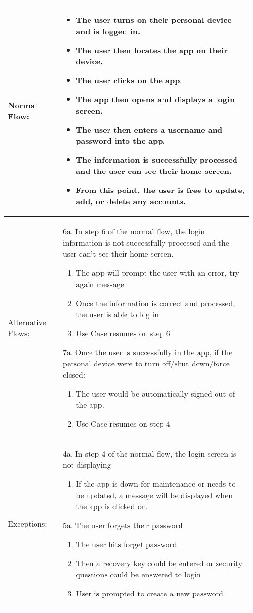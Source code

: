 \documentclass[stu]{apa7}
\newcommand{\nextitemblank}{\par\hspace*{\labelsep}\hspace*{\labelsep}}
\begin{document}
{{\begin{xltabular}{\textwidth}{|l|X|}
  Normal Flow: & 
    \begin{itemize}
      \item The user turns on their personal device and is logged in. 
      \item The user then locates the app on their device. 
      \item The user clicks on the app.
      \item The app then opens and displays a login screen.
      \item The user then enters a username and password into the app.
      \item The information is successfully processed and the user can see their home screen.
      \item From this point, the user is free to update, add, or delete any accounts.
    \end{itemize} \\ \hline

  Alternative Flows: & \nextitemblank 6a. In step 6 of the normal flow, the login information is not successfully processed and the user can’t see their home screen.
   \begin{enumerate}
      \item The app will prompt the user with an error, try again message 
      \item Once the information is correct and processed, the user is able to log in
      \item Use Case resumes on step 6
    \end{enumerate}
    \nextitemblank 7a. Once the user is successfully in the app, if the personal device were to turn off/shut down/force closed:
    \begin{enumerate}
      \item The user would be automatically signed out of the app.
      \item Use Case resumes on step 4 
   \end{enumerate} \\ \hline
  
  Exceptions: & \nextitemblank 4a. In step 4 of the normal flow, the login screen is not displaying 
    \begin{enumerate}
      \item If the app is down for maintenance or needs to be updated, a message will be displayed when the app is clicked on.
    \end{enumerate} 
  \nextitemblank 5a. The user forgets their password 
    \begin{enumerate}
      \item The user hits forget password
      \item Then a recovery key could be entered or security questions could be answered to login
      \item User is prompted to create a new password 
    \end{enumerate} \\ \hline


\end{xltabular}}}
\end{document}
